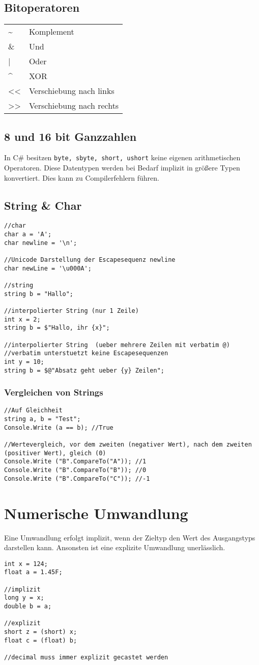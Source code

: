 \subsection{Bitoperatoren}
\begin{tabular}{p{3cm}p{5cm}}
\~{}	&Komplement\\
\& 	&Und\\
| 	&Oder\\
\^{}	&XOR\\
<<	&Verschiebung nach links\\
>>	&Verschiebung nach rechts\\
\end{tabular}
\subsection{8 und 16 bit Ganzzahlen}
In C\# besitzen \texttt{byte, sbyte, short, ushort} keine eigenen arithmetischen Operatoren. Diese Datentypen werden bei Bedarf implizit in größere Typen konvertiert. Dies kann zu Compilerfehlern führen.
\subsection{String \& Char}
\begin{lstlisting}
//char
char a = 'A';
char newline = '\n';

//Unicode Darstellung der Escapesequenz newline
char newLine = '\u000A';

//string
string b = "Hallo";

//interpolierter String (nur 1 Zeile)
int x = 2;
string b = $"Hallo, ihr {x}";

//interpolierter String  (ueber mehrere Zeilen mit verbatim @)
//verbatim unterstuetzt keine Escapesequenzen
int y = 10;
string b = $@"Absatz geht ueber {y} Zeilen";
\end{lstlisting}
\subsubsection{Vergleichen von Strings}
\begin{lstlisting}
//Auf Gleichheit
string a, b = "Test";
Console.Write (a == b); //True

//Wertevergleich, vor dem zweiten (negativer Wert), nach dem zweiten (positiver Wert), gleich (0)
Console.Write ("B".CompareTo("A"));	//1
Console.Write ("B".CompareTo("B"));	//0
Console.Write ("B".CompareTo("C"));	//-1
\end{lstlisting}
\section{Numerische Umwandlung}
Eine Umwandlung erfolgt implizit, wenn der Zieltyp den Wert des Ausgangstyps darstellen kann. Ansonsten ist eine explizite Umwandlung unerlässlich.
\begin{lstlisting}
int x = 124;
float a = 1.45F;

//implizit
long y = x;
double b = a;

//explizit
short z = (short) x;
float c = (float) b;

//decimal muss immer explizit gecastet werden
\end{lstlisting}
